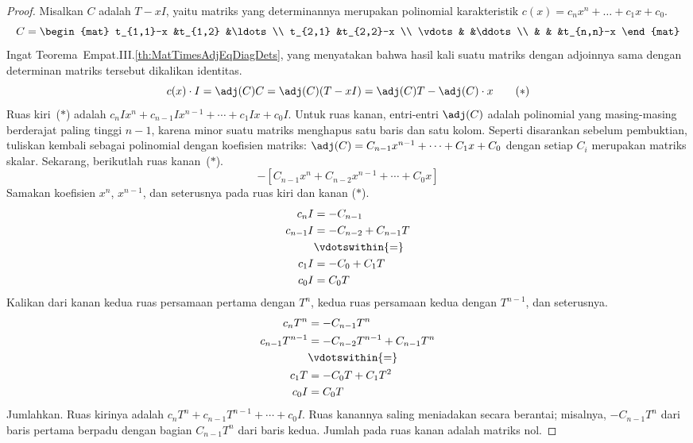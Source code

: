 \begin{proof}
Misalkan \( C \) adalah \( T-xI \),
yaitu matriks yang determinannya merupakan polinomial karakteristik
\( c(x)=c_nx^n+\dots+c_1x+c_0 \).
\begin{equation*}
  C=\begin{mat}
    t_{1,1}-x        &t_{1,2}   &\ldots        \\
    t_{2,1}          &t_{2,2}-x               \\
    \vdots           &          &\ddots       \\
                     &          &       &t_{n,n}-x
  \end{mat}
\end{equation*}
Ingat Teorema~Empat.III.\ref{th:MatTimesAdjEqDiagDets},
yang menyatakan bahwa hasil kali suatu matriks dengan adjoinnya sama dengan
determinan matriks tersebut dikalikan identitas.
\begin{equation*}
  c(x)\cdot I
  =\adj (C)C
  =\adj (C)(T-xI)
  =\adj (C)T- \adj(C)\cdot x
\tag*{($*$)}
\end{equation*}
Ruas kiri~($*$) adalah
$c_nIx^n+c_{n-1}Ix^{n-1}+\cdots+c_1Ix+c_0I$.
Untuk ruas kanan,
entri-entri \( \adj (C) \) adalah polinomial yang masing-masing berderajat
paling tinggi \( n-1 \), karena minor suatu matriks menghapus satu baris dan satu kolom.
Seperti disarankan sebelum pembuktian, tuliskan kembali sebagai polinomial dengan
koefisien matriks:
\( \adj (C)=C_{n-1}x^{n-1}+\cdots+C_1x+C_0 \)
dengan setiap \( C_i \) merupakan matriks skalar.
Sekarang, berikutlah ruas kanan~($*$).
\begin{equation*}
  [(C_{n-1}T)x^{n-1}+\cdots+(C_1T)x+C_0T]  
   -[C_{n-1}x^n+C_{n-2}x^{n-1}+\cdots+C_0x]
\end{equation*}
Samakan koefisien \( x^n \), $x^{n-1}$, dan seterusnya
pada ruas kiri dan kanan ($*$).
\begin{align*}
  c_nI
  &=-C_{n-1}    \\
  c_{n-1}I
  &=-C_{n-2}+C_{n-1}T    \\
  &\vdotswithin{=}             \\
  c_{1}I
  &=-C_{0}+C_{1}T    \\
  c_{0}I
  &=C_{0}T
\end{align*}
Kalikan dari kanan kedua ruas persamaan pertama dengan \( T^n \),
kedua ruas persamaan kedua dengan \( T^{n-1} \), dan seterusnya.
\begin{align*}
  c_nT^n
  &=-C_{n-1}T^n    \\
  c_{n-1}T^{n-1}
  &=-C_{n-2}T^{n-1}+C_{n-1}T^n    \\
  &\vdotswithin{=}             \\
  c_{1}T
  &=-C_{0}T+C_{1}T^2    \\
  c_{0}I
  &=C_{0}T
\end{align*}
Jumlahkan.
Ruas kirinya adalah
\( c_nT^n+c_{n-1}T^{n-1}+\cdots+c_0I \).
Ruas kanannya saling meniadakan secara berantai;
misalnya, $-C_{n-1}T^n$ dari baris pertama berpadu dengan
bagian $C_{n-1}T^n$ dari baris kedua.
Jumlah pada ruas kanan adalah matriks nol.
\end{proof}

